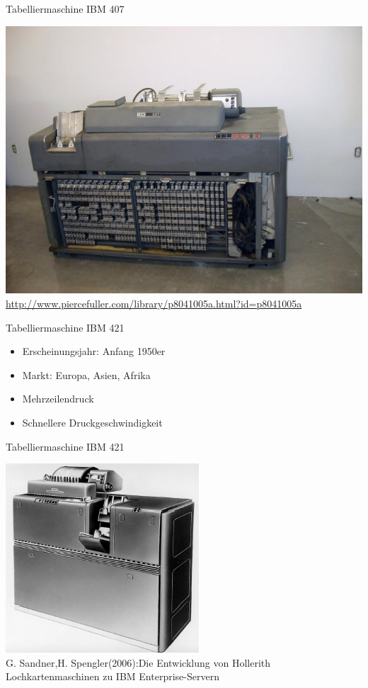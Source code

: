 \documentclass[EU2]{beamer}
\begin{document}
\begin{frame}[plain]{Tabelliermaschine IBM 407}
\begin{center}
    \includegraphics[height=0.95\textheight]{IBM407}\\
    \tiny{\url{http://www.piercefuller.com/library/p8041005a.html?id=p8041005a}}
  \end{center}
\end{frame}

\begin{frame}{Tabelliermaschine IBM 421}
    \begin{itemize}
      \item Erscheinungsjahr: Anfang 1950er
      \item Markt: Europa, Asien, Afrika
      \item Mehrzeilendruck
      \item Schnellere Druckgeschwindigkeit
    \end{itemize}
\end{frame}

\begin{frame}[plain]{Tabelliermaschine IBM 421}
\begin{center}
    \includegraphics[height=0.95\textheight]{IBM421}\\
    \tiny{G. Sandner,H. Spengler(2006):Die Entwicklung von Hollerith Lochkartenmaschinen zu IBM Enterprise-Servern}
  \end{center}
\end{frame}
\end{document}
